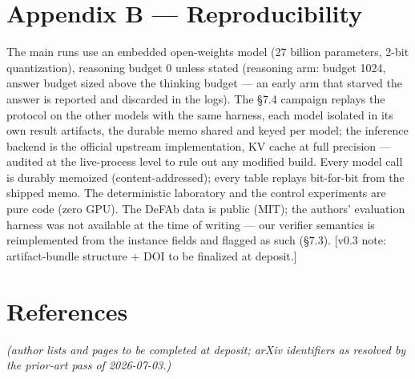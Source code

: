 \documentclass[11pt]{article}
\begin{document}
\section*{Appendix B — Reproducibility}

The main runs use an embedded open-weights model (27 billion parameters, 2-bit quantization), reasoning budget 0 unless stated (reasoning arm: budget 1024, answer budget sized above the thinking budget — an early arm that starved the answer is reported and discarded in the logs). The §7.4 campaign replays the protocol on the other models with the same harness, each model isolated in its own result artifacts, the durable memo shared and keyed per model; the inference backend is the official upstream implementation, KV cache at full precision — audited at the live-process level to rule out any modified build. Every model call is durably memoized (content-addressed); every table replays bit-for-bit from the shipped memo. The deterministic laboratory and the control experiments are pure code (zero GPU). The DeFAb data is public (MIT); the authors' evaluation harness was not available at the time of writing — our verifier semantics is reimplemented from the instance fields and flagged as such (§7.3). [v0.3 note: artifact-bundle structure + DOI to be finalized at deposit.]

\section*{References}

\emph{(author lists and pages to be completed at deposit; arXiv identifiers as resolved by the prior-art pass of 2026-07-03.)}
\end{document}
